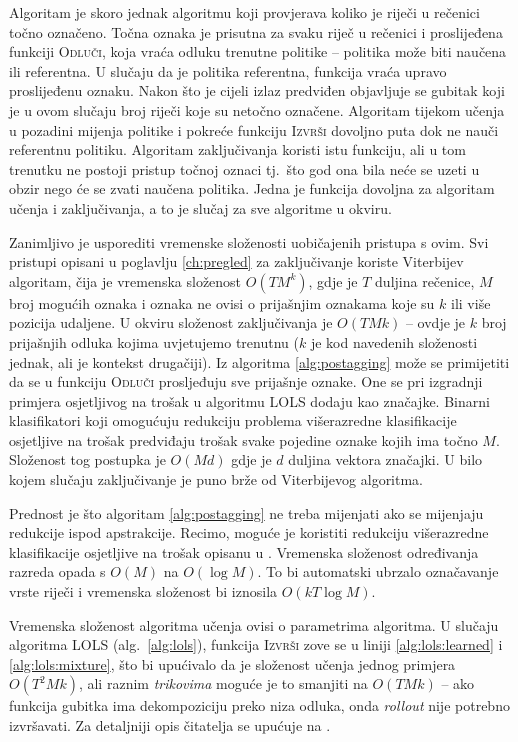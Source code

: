 Algoritam je skoro jednak algoritmu koji provjerava koliko je riječi u rečenici
točno označeno. Točna oznaka je prisutna za svaku riječ u rečenici i proslijeđena
funkciji \textsc{Odluči}, koja vraća odluku trenutne politike -- politika može biti
naučena ili referentna. U slučaju da je politika referentna, funkcija vraća upravo
proslijeđenu oznaku. Nakon što je cijeli izlaz predviđen objavljuje se gubitak
koji je u ovom slučaju broj riječi koje su netočno označene. Algoritam tijekom
učenja u pozadini mijenja politike i pokreće funkciju \textsc{Izvrši} dovoljno puta
dok ne nauči referentnu politiku. Algoritam zaključivanja koristi istu funkciju,
ali u tom trenutku ne postoji pristup točnoj oznaci tj.~što god ona bila neće se
uzeti u obzir nego će se zvati naučena politika. Jedna je funkcija dovoljna za
algoritam učenja i zaključivanja, a to je slučaj za sve algoritme u \lts{}
okviru.

Zanimljivo je usporediti vremenske složenosti uobičajenih pristupa s ovim. Svi
pristupi opisani u poglavlju \ref{ch:pregled} za zaključivanje koriste
Viterbijev algoritam, čija je vremenska složenost $O(T M ^ k)$, gdje je $T$
duljina rečenice, $M$ broj mogućih oznaka i oznaka ne ovisi o prijašnjim
oznakama koje su $k$ ili više pozicija udaljene. U okviru \lts{} složenost
zaključivanja je $O(T M k)$ -- ovdje je $k$ broj prijašnjih odluka kojima
uvjetujemo trenutnu ($k$ je kod navedenih složenosti jednak, ali je kontekst
drugačiji). Iz algoritma \ref{alg:postagging} može se primijetiti da se u
funkciju \textsc{Odluči} prosljeđuju sve prijašnje oznake. One se pri izgradnji
primjera osjetljivog na trošak u algoritmu \textsc{LOLS} dodaju kao značajke.
Binarni klasifikatori koji omogućuju redukciju problema višerazredne
klasifikacije osjetljive na trošak predviđaju trošak svake pojedine oznake kojih
ima točno $M$. Složenost tog postupka je $O(M d)$ gdje je $d$ duljina vektora
značajki. U bilo kojem slučaju zaključivanje je puno brže od Viterbijevog
algoritma.

Prednost je što algoritam \ref{alg:postagging} ne treba mijenjati ako se
mijenjaju redukcije ispod apstrakcije. Recimo, moguće je koristiti redukciju
višerazredne klasifikacije osjetljive na trošak opisanu u
\citep{beygelzimer2009error, daume2016one}. Vremenska složenost određivanja
razreda opada s $O(M)$ na $O(\log M)$. To bi automatski ubrzalo označavanje
vrste riječi i vremenska složenost bi iznosila $O(k T \log M)$.

Vremenska složenost algoritma učenja ovisi o parametrima algoritma. U slučaju
algoritma \textsc{LOLS} (alg.~\ref{alg:lols}), funkcija \textsc{Izvrši} zove se u
liniji \ref{alg:lols:learned} i \ref{alg:lols:mixture}, što bi upućivalo da je
složenost učenja jednog primjera $O(T ^ 2 M k)$, ali raznim \textit{trikovima}
moguće je to smanjiti na $O(T M k)$ -- ako funkcija gubitka ima dekompoziciju
preko niza odluka, onda \textit{rollout} nije potrebno izvršavati. Za detaljniji
opis čitatelja se upućuje na \citep{daume14lts}.

